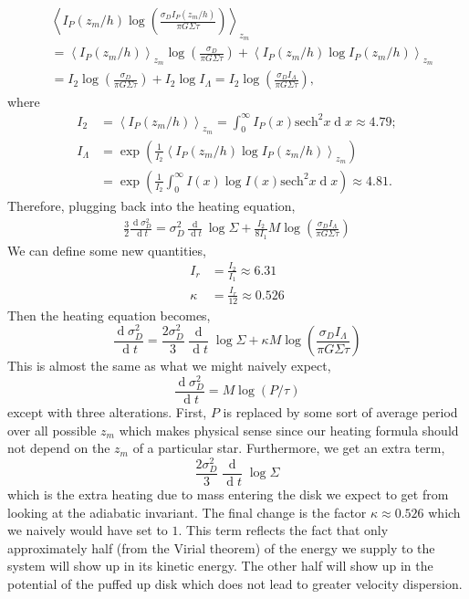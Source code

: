 \documentclass[usenatbib]{mnras}
\renewcommand{\d}[1]{\! \mathrm{d}#1 \:}
\newcommand{\deriv}[2]{\frac{\d{#1}}{\d{#2}}}
\newcommand{\sech}{\mathrm{sech}}
\newcommand{\EV}[1]{\left< #1 \right>}
\renewcommand{\d}[1]{\ensuremath{\operatorname{d}\!{#1}}}
\begin{document}
\begin{align}
& \EV{ I_P(z_m / h)  \log{\left( \frac{\sigma_D I_P(z_m / h)}{\pi G \Sigma \tau} \right)} }_{z_m}
\\
& = \EV{I_P(z_m / h)}_{z_m} \log{\left( \frac{\sigma_D}{\pi G \Sigma \tau} \right)}  + \EV{I_P(z_m/h) \log{I_P(z_m / h)}}_{z_m} \nonumber
\\
& = I_2 \log{\left( \frac{\sigma_D}{\pi G \Sigma \tau} \right)} + I_2 \log{I_{\Lambda}} = I_2 \log{\left( \frac{\sigma_D I_{\Lambda}}{\pi G \Sigma \tau} \right)}, \nonumber
\end{align}
where
\begin{align}
I_2 & = \EV{I_P(z_m / h)}_{z_m} = \int_0^\infty I_P(x) \sech^2{x} \d{x} \approx 4.79;
\\
I_{\Lambda} & = \exp{\left( \frac{1}{I_2} \EV{I_P(z_m / h) \log{I_P(z_m / h)} }_{z_m} \right)} \nonumber
\\
& = \exp{\left( \frac{1}{I_2} \int_0^\infty I(x) \log{I(x)} \sech^2{x} \d{x} \right)} \approx 4.81.
\end{align}
Therefore, plugging back into the heating equation,
\begin{align}
\frac{3}{2} \deriv{\sigma_D^2}{t} = \sigma_D^2 \deriv{}{t} \log{\Sigma} + \frac{I_2}{8 I_1} M \log{\left( \frac{\sigma_D I_{\Lambda}}{\pi G \Sigma \tau} \right)}
\end{align}
We can define some new quantities,
\begin{align*}
I_r & = \frac{I_2}{I_1} \approx 6.31
\\
\kappa & = \frac{I_r}{12} \approx 0.526
\end{align*}
Then the heating equation becomes,
\begin{equation}
\deriv{\sigma_D^2}{t} = \frac{2\sigma_D^2}{3} \deriv{}{t} \log{\Sigma} + \kappa M \log{\left( \frac{\sigma_D I_{\Lambda}}{\pi G \Sigma \tau} \right)}
\end{equation}
This is almost the same as what we might naively expect,
\[ \deriv{\sigma_D^2}{t} = M \log{(P / \tau)} \]
except with three alterations. First, $P$ is replaced by some {\color{red} sort} of average period over all possible $z_m$ which makes physical sense since our heating formula should not depend on the $z_m$ of a particular star. Furthermore, we get an extra term,
\[ \frac{2\sigma_D^2}{3} \deriv{}{t} \log{\Sigma} \]
which is the extra heating due to mass entering the disk we expect to get from looking at the adiabatic invariant. The final change is the factor $\kappa \approx 0.526$ which we naively would have set to $1$. This term reflects the fact that only approximately half (from the Virial theorem) of the energy we supply to the system will show up in its kinetic energy. The other half will show up in the potential of the puffed up disk which does not lead to greater velocity dispersion.   


 
\end{document}
